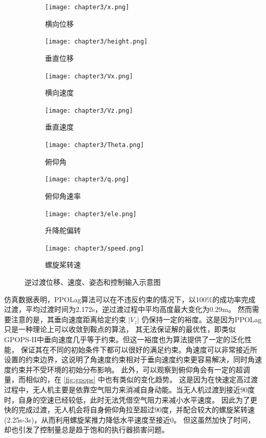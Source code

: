 \begin{figure}[H]
    \centering
    \begin{subfigure}{.46\textwidth}
        \centering
        \texttt{[image: chapter3/x.png]}
        \caption{横向位移}
        \label{fig:sub1}
    \end{subfigure}%
    \begin{subfigure}{.46\textwidth}
        \centering
        \texttt{[image: chapter3/height.png]}
        \caption{垂直位移}
        \label{fig:sub2}
    \end{subfigure}
    \begin{subfigure}{.46\textwidth}
        \centering
        \texttt{[image: chapter3/Vx.png]}
        \caption{横向速度}
        \label{fig:sub3}
    \end{subfigure}%
    \begin{subfigure}{.46\textwidth}
        \centering
        \texttt{[image: chapter3/Vz.png]}
        \caption{垂直速度}
        \label{fig:sub4}
    \end{subfigure}
    \begin{subfigure}{.46\textwidth}
        \centering
        \texttt{[image: chapter3/Theta.png]}
        \caption{俯仰角}
        \label{fig:sub5}
    \end{subfigure}%
    \begin{subfigure}{.46\textwidth}
        \centering
        \texttt{[image: chapter3/q.png]}
        \caption{俯仰角速率}
        \label{fig:sub6}
    \end{subfigure}
    \begin{subfigure}{.46\textwidth}
        \centering
        \texttt{[image: chapter3/ele.png]}
        \caption{升降舵偏转}
        \label{fig:sub7}
    \end{subfigure}%
    \begin{subfigure}{.46\textwidth}
        \centering
        \texttt{[image: chapter3/speed.png]}
        \caption{螺旋桨转速}
        \label{fig:sub8}
    \end{subfigure}
    \caption{逆过渡位移、速度、姿态和控制输入示意图}
    \label{fig:mcflight_all}
\end{figure}

仿真数据表明，PPOLag算法可以在不违反约束的情况下，以100\%的成功率完成过渡，平均过渡时间为2.172s，逆过渡过程中平均高度最大变化为0.29m。
然而需要注意的是，其垂向速度距离给定约束 $\left | V_{z} \right |$ 仍保持一定的裕度。这是因为PPOLag只是一种理论上可以收敛到鞍点的算法，
其无法保证解的最优性，即类似GPOPS-II中垂向速度几乎等于约束。但这一裕度也为算法提供了一定的泛化性能，
保证其在不同的初始条件下都可以很好的满足约束。角速度可以非常接近所设置的约束边界，这说明了角速度约束相对于垂向速度约束更容易解决，同时角速度约束并不受环境的初始分布影响。
此外，可以观察到俯仰角会有一定的超调量，而相似的，在 \autoref{fig:gpops} 中也有类似的变化趋势。
这是因为在快速定高过渡过程中，无人机主要是依靠空气阻力来消减自身动能。当无人机过渡到接近90度时，自身的空速已经较低，此时无法凭借空气阻力来减小水平速度。
因此为了更快的完成过渡，无人机会将自身俯仰角拉至超过90度，并配合较大的螺旋桨转速(2.25s-3s)，从而利用螺旋桨推力降低水平速度至接近0。
但这虽然加快了时间，却也引发了控制量总是趋于饱和的执行器损害问题。

